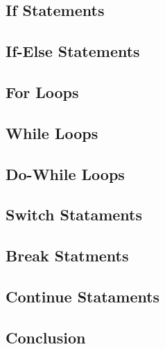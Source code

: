 

\subsection{If Statements}

\subsection{If-Else Statements}

\subsection{For Loops}

\subsection{While Loops}

\subsection{Do-While Loops}

\subsection{Switch Stataments}

\subsection{Break Statments}

\subsection{Continue Stataments}

\subsection{Conclusion}
